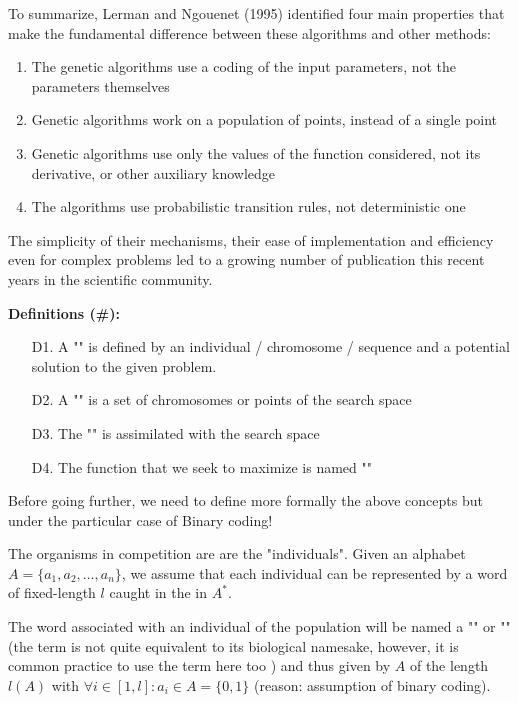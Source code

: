 	To summarize, Lerman and Ngouenet (1995) identified four main properties that make the fundamental difference between these algorithms and other methods:
	\begin{enumerate}
		\item The genetic algorithms use a coding of the input parameters, not the parameters themselves

		\item  Genetic algorithms work on a population of points, instead of a single point

		\item Genetic algorithms use only the values of the function considered, not its derivative, or other auxiliary knowledge

		\item  The algorithms use probabilistic transition rules, not deterministic one
	\end{enumerate}
	The simplicity of their mechanisms, their ease of implementation and efficiency even for complex problems led to a growing number of publication this recent years in the scientific community.
	
	\textbf{Definitions (\#\mydef):}
	\begin{enumerate}
		\item[D1.] A "" is defined by an individual / chromosome / sequence and a potential solution to the given problem.

		\item[D2.]  A "" is a set of chromosomes or points of the search space

		\item[D3.]  The "" is assimilated with the search space

		\item[D4.]  The function that we seek to maximize is named ""
	\end{enumerate}

	Before going further, we need to define more formally the above concepts but under the particular case of Binary coding!
	
	The organisms in competition are are the "individuals". Given an alphabet $A=\{a_1,a_2,\ldots,a_n\}$, we assume that each individual can be represented by a word of fixed-length $l$ caught in the in $A^{*}$. 

	The word associated with an individual of the population will be named a "" or "" (the term is not quite equivalent to its biological namesake, however, it is common practice to use the term here too ) and thus given by $A$ of the length $l(A)$ with $\forall i\in[1,l]: a_i\in A=\{0,1\}$ (reason: assumption of binary coding).

